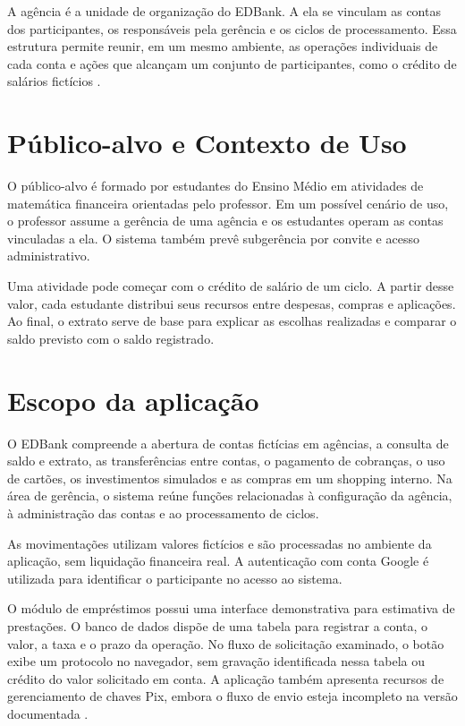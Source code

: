 A agência é a unidade de organização do EDBank. A ela se vinculam
as contas dos participantes, os responsáveis pela gerência e os
ciclos de processamento. Essa estrutura permite reunir, em um
mesmo ambiente, as operações individuais de cada conta e ações
que alcançam um conjunto de participantes, como o crédito de
salários fictícios \cite{bravin2026edbank}.

\section{Público-alvo e Contexto de Uso} 
\label{cap-cencepcao-publico}

O público-alvo é formado por estudantes do Ensino Médio em
atividades de matemática financeira orientadas pelo professor.
Em um possível cenário de uso, o professor assume a gerência de
uma agência e os estudantes operam as contas vinculadas a ela.
O sistema também prevê subgerência por convite e acesso
administrativo.

Uma atividade pode começar com o crédito de salário de um ciclo.
A partir desse valor, cada estudante distribui seus recursos entre
despesas, compras e aplicações. Ao final, o extrato serve de base
para explicar as escolhas realizadas e comparar o saldo previsto
com o saldo registrado.

\section{Escopo da aplicação}
\label{cap-concepcao-escopo}

O EDBank compreende a abertura de contas fictícias em agências,
a consulta de saldo e extrato, as transferências entre contas,
o pagamento de cobranças, o uso de cartões, os investimentos
simulados e as compras em um shopping interno. Na área de gerência,
o sistema reúne funções relacionadas à configuração da agência,
à administração das contas e ao processamento de ciclos.

As movimentações utilizam valores fictícios e são processadas no
ambiente da aplicação, sem liquidação financeira real. A
autenticação com conta Google é utilizada para identificar o
participante no acesso ao sistema.

O módulo de empréstimos possui uma interface demonstrativa para
estimativa de prestações. O banco de dados dispõe de uma tabela
para registrar a conta, o valor, a taxa e o prazo da operação.
No fluxo de solicitação examinado, o botão exibe um protocolo no
navegador, sem gravação identificada nessa tabela ou crédito do
valor solicitado em conta. A aplicação também apresenta recursos
de gerenciamento de chaves Pix, embora o fluxo de envio esteja
incompleto na versão documentada \cite{bravin2026edbank}.

